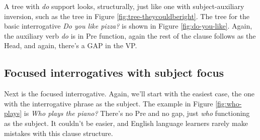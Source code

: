 A tree with \textit{do} support looks, structurally, just like one with subject-auxiliary inversion, such as the tree in Figure \ref{fig:tree-theycouldberight}. The tree for the basic interrogative \textit{Do you like pizza?} is shown in Figure \ref{fig:do-you-like}. Again, the auxiliary verb \textit{do} is in \textsf{Pre} function, again the rest of the clause follows as the \textsf{Head}, and again, there's a GAP in the VP.



\subsection{Focused interrogatives with subject focus}

Next is the focused interrogative. Again, we'll start with the easiest case, the one with the interrogative phrase as the subject. The example in Figure \ref{fig:who-plays} is \textit{Who plays the piano?} There's no \textsf{Pre} and no gap, just \textit{who} functioning as the subject. It couldn't be easier, and English language learners rarely make mistakes with this clause structure.


